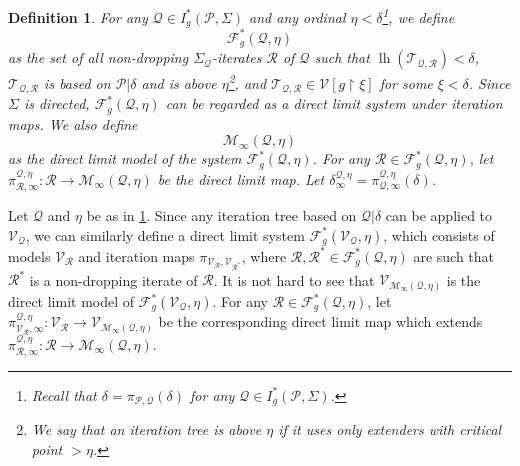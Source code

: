\documentclass{amsart}
\newtheorem{dfn}{Definition}[section]
\newcommand{\uphar}{\mathbin{\upharpoonright}}
\DeclareMathOperator{\lh}{lh}
\begin{document}
\begin{dfn}\label{dfn:internal_direct_limit_system}
For any $\mathcal{Q}\in I^*_{g}(\mathcal{P}, \Sigma)$ and any ordinal $\eta<\delta$\footnote{Recall that $\delta=\pi_{\mathcal{P}, \mathcal{Q}}(\delta)$ for any $\mathcal{Q}\in I^*_{g}(\mathcal{P}, \Sigma)$.}, we define
\[
\mathcal{F}^*_g(\mathcal{Q}, \eta)
\]
as the set of all non-dropping $\Sigma_{\mathcal{Q}}$-iterates $\mathcal{R}$ of $\mathcal{Q}$ such that $\lh(\mathcal{T}_{\mathcal{Q}, \mathcal{R}})<\delta$, $\mathcal{T}_{\mathcal{Q}, \mathcal{R}}$ is based on $\mathcal{P}\vert\delta$ and is above $\eta$\footnote{We say that an iteration tree is above $\eta$ if it uses only extenders with critical point $>\eta$.}, and $\mathcal{T}_{\mathcal{Q}, \mathcal{R}}\in\mathcal{V}[g\uphar\xi]$ for some $\xi<\delta$.
Since $\Sigma$ is directed, $\mathcal{F}^*_g(\mathcal{Q}, \eta)$ can be regarded as a direct limit system under iteration maps.
We also define
\[
\mathcal{M}_{\infty}(\mathcal{Q}, \eta)
\]
as the direct limit model of the system $\mathcal{F}^*_g(\mathcal{Q}, \eta)$.
For any $\mathcal{R}\in\mathcal{F}^*_g(\mathcal{Q}, \eta)$, let $\pi^{\mathcal{Q}, \eta}_{\mathcal{R}, \infty}\colon\mathcal{R}\to\mathcal{M}_{\infty}(\mathcal{Q}, \eta)$ be the direct limit map.
Let $\delta^{\mathcal{Q}, \eta}_{\infty}=\pi^{\mathcal{Q}, \eta}_{\mathcal{Q}, \infty}(\delta)$.
\end{dfn}

Let $\mathcal{Q}$ and $\eta$ be as in \cref{dfn:internal_direct_limit_system}.
Since any iteration tree based on $\mathcal{Q}\vert\delta$ can be applied to $\mathcal{V}_{\mathcal{Q}}$, we can similarly define a direct limit system $\mathcal{F}^*_g(\mathcal{V}_{\mathcal{Q}}, \eta)$, which consists of models $\mathcal{V}_{\mathcal{R}}$ and iteration maps $\pi_{\mathcal{V}_{\mathcal{R}}, \mathcal{V}_{\mathcal{R}^*}}$, where $\mathcal{R}, \mathcal{R}^*\in\mathcal{F}^*_g(\mathcal{Q}, \eta)$ are such that $\mathcal{R}^*$ is a non-dropping iterate of $\mathcal{R}$.
It is not hard to see that $\mathcal{V}_{\mathcal{M}_{\infty}(\mathcal{Q}, \eta)}$ is the direct limit model of $\mathcal{F}^*_g(\mathcal{V}_{\mathcal{Q}}, \eta)$.
For any $\mathcal{R}\in\mathcal{F}^*_g(\mathcal{Q}, \eta)$, let $\pi^{\mathcal{Q}, \eta}_{\mathcal{V}_{\mathcal{R}}, \infty}\colon\mathcal{V}_{\mathcal{R}}\to\mathcal{V}_{\mathcal{M}_{\infty}(\mathcal{Q}, \eta)}$ be the corresponding direct limit map which extends $\pi^{\mathcal{Q}, \eta}_{\mathcal{R}, \infty}\colon\mathcal{R}\to\mathcal{M}_{\infty}(\mathcal{Q}, \eta)$.
\end{document}
